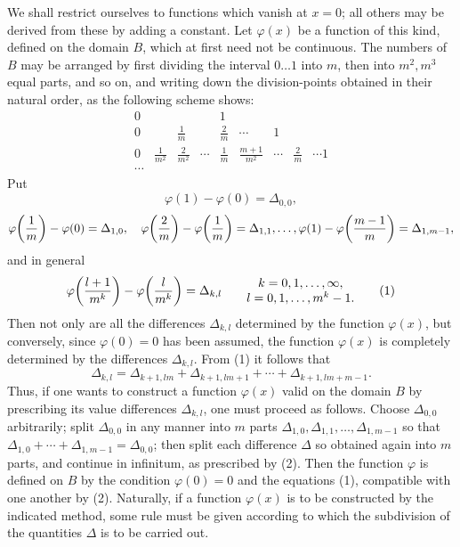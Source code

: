 We shall restrict ourselves to functions which vanish at $x=0$; all others may be derived from these by adding a constant. Let $\varphi(x)$ be a function of this kind, defined on the domain $B$, which at first need not be continuous. The numbers of $B$ may be arranged by first dividing the interval $0\ldots1$ into $m$, then into $m^2,m^3$ equal parts, and so on, and writing down the division-points obtained in their natural order, as the following scheme shows:
\[
\begin{array}{ccccccccc}
0&&&&1\\[2mm]
0&&\frac1m&&\frac2m&\cdots&1\\[2mm]
0&\frac1{m^2}&\frac2{m^2}&\cdots&\frac1m&\frac{m+1}{m^2}&\cdots&\frac2m&\cdots 1\\
\cdots&&&&&&&&
\end{array}
\]
Put
\[
\varphi(1)-\varphi(0)=\Delta_{0,0},
\]
\[
 \varphi\!\left({1\over m}\right)-\varphi(0)=\Delta_{1,0},\quad
 \varphi\!\left({2\over m}\right)-\varphi\!\left({1\over m}\right)=\Delta_{1,1},\ldots,
 \varphi(1)-\varphi\!\left({m-1\over m}\right)=\Delta_{1,m-1},
\]
and in general
\begin{equation}
\varphi\!\left({l+1\over m^k}\right)-\varphi\!\left({l\over m^k}\right)=\Delta_{k,l}
\qquad
\begin{matrix}
 k=0,1,\ldots,\infty,\\
 l=0,1,\ldots,m^k-1.
\end{matrix}
\tag{1}
\end{equation}
Then not only are all the differences $\Delta_{k,l}$ determined by the function $\varphi(x)$, but conversely, since $\varphi(0)=0$ has been assumed, the function $\varphi(x)$ is completely determined by the differences $\Delta_{k,l}$. From (1) it follows that
\begin{equation}
 \Delta_{k,l}=\Delta_{k+1,lm}+\Delta_{k+1,lm+1}+\cdots+\Delta_{k+1,lm+m-1}.
\tag{2}
\end{equation}
Thus, if one wants to construct a function $\varphi(x)$ valid on the domain $B$ by prescribing its value differences $\Delta_{k,l}$, one must proceed as follows. Choose $\Delta_{0,0}$ arbitrarily; split $\Delta_{0,0}$ in any manner into $m$ parts $\Delta_{1,0},\Delta_{1,1},\ldots,\Delta_{1,m-1}$ so that $\Delta_{1,0}+\cdots+\Delta_{1,m-1}=\Delta_{0,0}$; then split each difference $\Delta$ so obtained again into $m$ parts, and continue in infinitum, as prescribed by (2). Then the function $\varphi$ is defined on $B$ by the condition $\varphi(0)=0$ and the equations (1), compatible with one another by (2). Naturally, if a function $\varphi(x)$ is to be constructed by the indicated method, some rule must be given according to which the subdivision of the quantities $\Delta$ is to be carried out.

